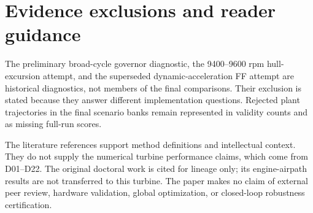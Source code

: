 \section{Evidence exclusions and reader guidance}
The preliminary broad-cycle governor diagnostic, the 9400--9600 rpm hull-excursion attempt, and the superseded dynamic-acceleration FF attempt are historical diagnostics, not members of the final comparisons. Their exclusion is stated because they answer different implementation questions. Rejected plant trajectories in the final scenario banks remain represented in validity counts and as missing full-run scores.

The literature references support method definitions and intellectual context. They do not supply the numerical turbine performance claims, which come from D01--D22. The original doctoral work is cited for lineage only; its engine-airpath results are not transferred to this turbine. The paper makes no claim of external peer review, hardware validation, global optimization, or closed-loop robustness certification.

\clearpage

